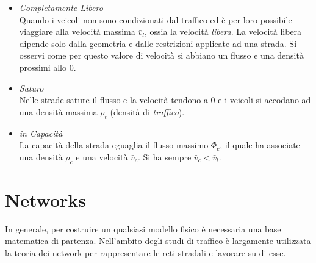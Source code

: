 \documentclass[../main.tex]{subfiles}
\begin{document}
\begin{itemize}
    \item \emph{Completamente Libero} 
        \\Quando i veicoli non sono condizionati dal traffico ed \`e per loro possibile viaggiare alla velocit\`a massima $\bar{v}_l$, ossia la velocit\`a \emph{libera}.
        La velocit\`a libera dipende solo dalla geometria e dalle restrizioni applicate ad una strada.
        Si osservi come per questo valore di velocit\`a si abbiano un flusso e una densit\`a prossimi allo $0$.
    \item \emph{Saturo}
        \\Nelle strade sature il flusso e la velocit\`a tendono a $0$ e i veicoli si accodano ad una densit\`a massima $\rho_t$ (densit\`a di \emph{traffico}).
    \item \emph{in Capacit\`a}
        \\La capacit\`a della strada eguaglia il flusso massimo $\Phi_c$, il quale ha associate una densit\`a $\rho_c$ e una velocit\`a $\bar{v}_c$.
        Si ha sempre $\bar{v}_c<\bar{v}_l$.
\end{itemize}

\section{Networks}
In generale, per costruire un qualsiasi modello fisico \`e necessaria una base matematica di partenza.
Nell'ambito degli studi di traffico \`e largamente utilizzata la teoria dei network per rappresentare le reti stradali e lavorare su di esse.
\end{document}
